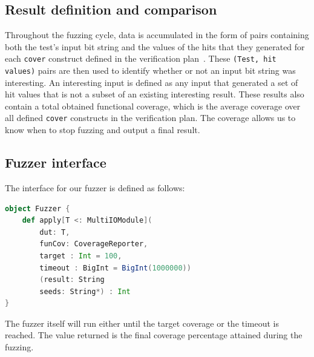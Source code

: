 \documentclass[conference]{IEEEtran}
\newcommand{\todo}[1]{{\color{olive} TODO: #1}}
\begin{document}
\subsection{Result definition and comparison}
Throughout the fuzzing cycle, data is accumulated in the form of pairs containing both the test's input bit string and the values of the hits that they generated for each \texttt{cover} construct defined in the verification plan~\cite{dobis2021opensource}.
These \texttt{(Test, hit values)} pairs are then used to identify whether or not an input bit string was interesting.
An interesting input is defined as any input that generated a set of hit values that is not a subset of an existing interesting result.
These results also contain a total obtained functional coverage, which is the average coverage over all defined \texttt{cover} constructs in the verification plan.
The coverage allows us to know when to stop fuzzing and output a final result.


\subsection{Fuzzer interface}
The interface for our fuzzer is defined as follows:
\begin{lstlisting}[captionpos=b,caption={Interface for the ChiselVerify fuzzer. It takes as parameter a \texttt{dut} and \texttt{chiselverify.coverage.CoverageReporter}, which is the verification plan used to define the functional coverage that will drive the fuzzing. It also takes in a target coverage percentage between 0 and 100, which defaults to 100, and a timeout which is set by default to 1'000'000 inputs. The second set of parameters are a result output file name, where all of the interesting tests and their resulting hit values will be written, as well as a variable number of file paths, which will be used as seeds for the mutation engine. },label={lst:dutexample},language=scala]
object Fuzzer {
    def apply[T <: MultiIOModule](
        dut: T, 
        funCov: CoverageReporter, 
        target : Int = 100,
        timeout : BigInt = BigInt(1000000))
        (result: String
        seeds: String*) : Int
}
\end{lstlisting}
The fuzzer itself will run either until the target coverage or the timeout is reached. The value returned is the final coverage percentage attained during the fuzzing.
\end{document}
